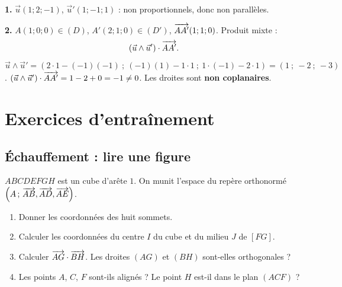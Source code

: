 \solution

\textbf{1.} $\vec u(1;2;-1)$, $\vec u'(1;-1;1)$ : non proportionnels, donc
non parallèles.

\textbf{2.} $A(1;0;0) \in (D)$, $A'(2;1;0) \in (D')$, $\overrightarrow{AA'}(1;1;0)$.
Produit mixte :
$$
(\vec u \wedge \vec u') \cdot \overrightarrow{AA'}.
$$
$\vec u \wedge \vec u' = (2\cdot1 - (-1)(-1)\ ;\ (-1)(1) - 1\cdot1\ ;\ 1\cdot(-1) - 2\cdot1)
= (1\ ;\ -2\ ;\ -3)$.
$(\vec u \wedge \vec u') \cdot \overrightarrow{AA'} = 1 - 2 + 0 = -1 \neq 0$.
Les droites sont \textbf{non coplanaires}.


\section{Exercices d'entraînement}

\subsection{Échauffement : lire une figure}

$ABCDEFGH$ est un cube d'arête $1$. On munit l'espace du repère orthonormé
$\left(A\,;\,\overrightarrow{AB},\overrightarrow{AD},\overrightarrow{AE}\right)$.

\begin{center}
\end{center}

\begin{enumerate}
	\item Donner les coordonnées des huit sommets.
	\item Calculer les coordonnées du centre $I$ du cube et du milieu $J$ de $[FG]$.
	\item Calculer $\overrightarrow{AG} \cdot \overrightarrow{BH}$. Les droites $(AG)$ et $(BH)$
	sont-elles orthogonales ?
	\item Les points $A$, $C$, $F$ sont-ils alignés ? Le point $H$ est-il dans
	le plan $(ACF)$ ?
\end{enumerate}

